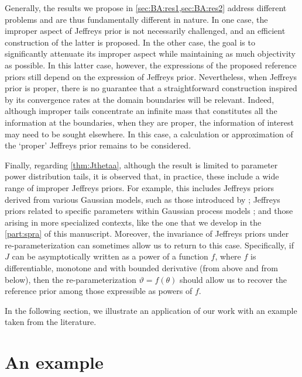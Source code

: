 Generally, the results we propose in \cref{sec:BA:res1,sec:BA:res2} address different problems and are thus  fundamentally different in nature. In one case, the improper aspect of Jeffreys prior is not necessarily challenged, and an efficient construction of the latter is proposed. In the other case, the goal is to significantly attenuate its improper aspect while maintaining as much objectivity as possible. In this latter case, however, the expressions of the proposed  reference priors still depend on the expression of Jeffreys prior. Nevertheless, when Jeffreys prior is proper, there is no guarantee that a straightforward construction inspired by its convergence rates at the domain boundaries will be relevant. %
Indeed, although improper tails concentrate an infinite mass that constitutes all the information at the boundaries, when they are proper, the information of interest may need to be sought elsewhere. In this case, a calculation or approximation of the `proper' Jeffreys prior remains to be considered.

Finally, regarding \cref{thm:Jthetaa}, although the result is limited to parameter power distribution tails, it is observed that, in practice, these include a wide range of improper Jeffreys priors.
For example, this includes Jeffreys priors derived from various Gaussian models, such as those introduced by \citet{neyman_consistent_1948}; Jeffreys priors related to specific parameters within Gaussian process models \citep{gu_parallel_2016}; and those arising in more specialized contexts, like the one %
that we develop in the \cref{part:spra} of this manuscript.
%
%
Moreover, the invariance of Jeffreys priors under re-parameterization can sometimes allow us to return to this case. Specifically, if $J$ can be asymptotically written as a power of a function $f$, where $f$ is differentiable, monotone and with bounded derivative (from above and from below), then the re-parameterization $\vartheta=f(\theta)$ %
should allow us to recover the reference prior among those expressible as powers of $f$.

In the following section, we illustrate an application of our work with an example taken from the literature.


\section{An example}\label{sec:BA:exa}


